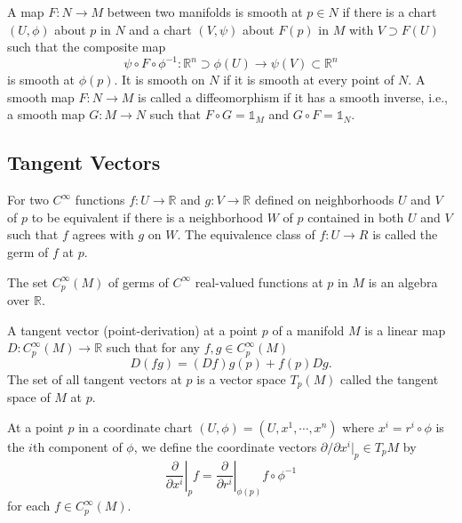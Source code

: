 \begin{definition}
    A map $F: N\to M$ between two manifolds is smooth at $p\in N$ if there is a chart $(U,\phi)$ about $p$ in $N$ and a chart $(V,\psi)$ about $F(p)$ in $M$ with $V \supset F(U)$ such that the composite map 
    \[\psi\circ F \circ \phi^{-1}: \mathbb{R}^n \supset \phi(U) \to \psi(V) \subset\mathbb{R}^n\]
    is smooth at $\phi(p)$. It is smooth on $N$ if it is smooth at every point of $N$. A smooth map $F: N \to M$ is called a diffeomorphism if it has a smooth inverse, i.e., a smooth map $G: M \to N$ such that $F \circ G=\mathds{1}_M $ and $G\circ F = \mathds{1}_N$.
\end{definition}

\subsection{Tangent Vectors}

\begin{definition}
    For two $C^{\infty}$ functions $f: U \to \mathbb{R}$ and $g: V \to \mathbb{R}$ defined on neighborhoods $U$ and $V$ of $p$ to be equivalent if there is a neighborhood $W$ of $p$ contained in both $U$ and $V$ such that $f$ agrees with $g$ on $W$. The equivalence class of $f : U \to R$ is called the germ of $f$ at $p$. \par The set $C^{\infty}_p(M)$ of germs of $C^{\infty}$ real-valued functions at $p$ in $M$ is an algebra over $\mathbb{R}$.
\end{definition}

\begin{definition}
    A tangent vector (point-derivation) at a point $p$ of a manifold $M$ is a linear map $D:C^{\infty}_p(M) \to \mathbb{R}$ such that for any $f,g \in C^{\infty}_p(M)$
    \[ D(fg) = (Df)g(p) + f(p)Dg.\]
    The set of all tangent vectors at $p$ is a vector space $T_p(M)$ called the tangent space of $M$ at $p$. 
\end{definition}

\begin{definition}
    At a point $p$ in a coordinate chart $(U,\phi) = (U,x^1,\cdots,x^n)$ where $x^i = r^i \circ \phi$ is the $i$th component of $\phi$, we define the coordinate vectors $\partial/\partial x^i|_p \in T_p M$ by
    \[\left.\dfrac{\partial}{\partial x^i}\right|_p f = \left.\dfrac{\partial}{\partial r^i}\right|_{\phi(p)}f\circ \phi^{-1}\]
    for each $f\in C^{\infty}_p(M)$.
\end{definition}

